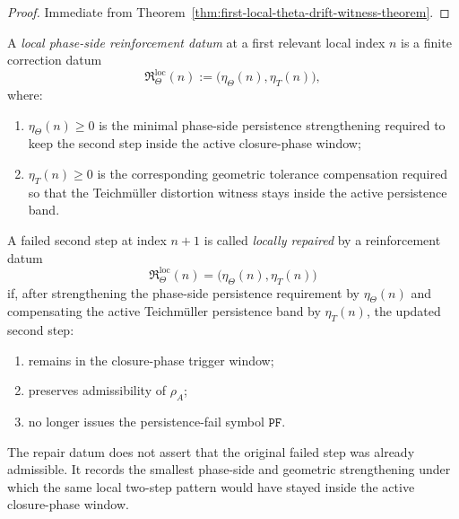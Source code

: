 \begin{proof}
Immediate from Theorem~\ref{thm:first-local-theta-drift-witness-theorem}.
\end{proof}


\begin{definition}
\label{def:local-phase-side-reinforcement-datum}
A \emph{local phase-side reinforcement datum} at a first relevant local index $n$ is a finite correction datum
\[
\mathfrak{R}_{\Theta}^{\mathrm{loc}}(n)
:=
\bigl(
\eta_{\Theta}(n),
\eta_{T}(n)
\bigr),
\]
where:
\begin{enumerate}
 \item $\eta_{\Theta}(n)\ge 0$ is the minimal phase-side persistence strengthening required to keep the second step inside the active closure-phase window;
 \item $\eta_{T}(n)\ge 0$ is the corresponding geometric tolerance compensation required so that the Teichm\"uller distortion witness stays inside the active persistence band.
\end{enumerate}
\end{definition}

\begin{definition}
\label{def:local-repaired-second-step}
A failed second step at index $n+1$ is called \emph{locally repaired} by a reinforcement datum
\[
\mathfrak{R}_{\Theta}^{\mathrm{loc}}(n)
=
\bigl(
\eta_{\Theta}(n),
\eta_{T}(n)
\bigr)
\]
if, after strengthening the phase-side persistence requirement by $\eta_{\Theta}(n)$ and compensating the active Teichm\"uller persistence band by $\eta_{T}(n)$, the updated second step:
\begin{enumerate}
 \item remains in the closure-phase trigger window;
 \item preserves admissibility of $\rho_A$;
 \item no longer issues the persistence-fail symbol $\mathtt{PF}$.
\end{enumerate}
\end{definition}

\begin{remark}
\label{rem:meaning-of-local-repair}
The repair datum does not assert that the original failed step was already admissible.
It records the smallest phase-side and geometric strengthening under which the same local two-step pattern would have stayed inside the active closure-phase window.
\end{remark}

